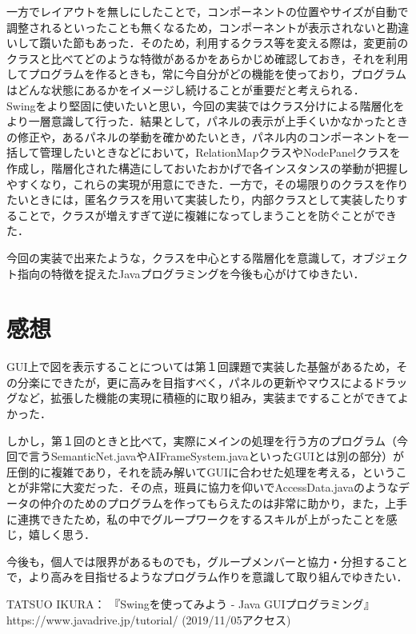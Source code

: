 \documentclass[12pt]{jarticle}
\begin{document}
一方でレイアウトを無しにしたことで，コンポーネントの位置やサイズが自動で調整されるといったことも無くなるため，コンポーネントが表示されないと勘違いして躓いた節もあった．そのため，利用するクラス等を変える際は，変更前のクラスと比べてどのような特徴があるかをあらかじめ確認しておき，それを利用してプログラムを作るときも，常に今自分がどの機能を使っており，プログラムはどんな状態にあるかをイメージし続けることが重要だと考えられる．\\

Swingをより堅固に使いたいと思い，今回の実装ではクラス分けによる階層化をより一層意識して行った．結果として，パネルの表示が上手くいかなかったときの修正や，あるパネルの挙動を確かめたいとき，パネル内のコンポーネントを一括して管理したいときなどにおいて，RelationMapクラスやNodePanelクラスを作成し，階層化された構造にしておいたおかげで各インスタンスの挙動が把握しやすくなり，これらの実現が用意にできた．一方で，その場限りのクラスを作りたいときには，匿名クラスを用いて実装したり，内部クラスとして実装したりすることで，クラスが増えすぎて逆に複雑になってしまうことを防ぐことができた．

今回の実装で出来たような，クラスを中心とする階層化を意識して，オブジェクト指向の特徴を捉えたJavaプログラミングを今後も心がけてゆきたい．

\section{感想}
GUI上で図を表示することについては第１回課題で実装した基盤があるため，その分楽にできたが，更に高みを目指すべく，パネルの更新やマウスによるドラッグなど，拡張した機能の実現に積極的に取り組み，実装まですることができてよかった．

しかし，第１回のときと比べて，実際にメインの処理を行う方のプログラム（今回で言うSemanticNet.javaやAIFrameSystem.javaといったGUIとは別の部分）が圧倒的に複雑であり，それを読み解いてGUIに合わせた処理を考える，ということが非常に大変だった．その点，班員に協力を仰いでAccessData.javaのようなデータの仲介のためのプログラムを作ってもらえたのは非常に助かり，また，上手に連携できたため，私の中でグループワークをするスキルが上がったことを感じ，嬉しく思う．

今後も，個人では限界があるものでも，グループメンバーと協力・分担することで，より高みを目指せるようなプログラム作りを意識して取り組んでゆきたい．


\begin{thebibliography}{99}
TATSUO IKURA： 『Swingを使ってみよう - Java GUIプログラミング』 https://www.javadrive.jp/tutorial/ (2019/11/05アクセス) \\
\end{thebibliography}
\end{document}
